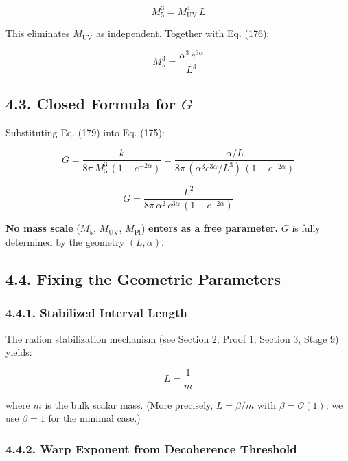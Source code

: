 \documentclass[
  11pt,
]{article}
\begin{document}
\[M_5^3 = M_{\text{UV}}^4\,L \tag{178}\]

This eliminates \(M_{\text{UV}}\) as independent. Together with Eq.
(176):

\[M_5^3 = \frac{\alpha^3\,e^{3\alpha}}{L^3} \tag{179}\]

\bigskip

\hypertarget{closed-formula-for-g}{%
\subsection{\texorpdfstring{4.3. Closed Formula for
\(G\)}{4.3. Closed Formula for G}}\label{closed-formula-for-g}}

Substituting Eq. (179) into Eq. (175):

\[G = \frac{k}{8\pi\,M_5^3\,(1 - e^{-2\alpha})} = \frac{\alpha/L}{8\pi\,(\alpha^3 e^{3\alpha}/L^3)\,(1 - e^{-2\alpha})} \tag{180}\]

\[\boxed{G = \frac{L^2}{8\pi\,\alpha^2\,e^{3\alpha}\,(1 - e^{-2\alpha})}} \tag{181}\]

\textbf{No mass scale} (\(M_5\), \(M_{\text{UV}}\), \(M_{\text{Pl}}\))
\textbf{enters as a free parameter.} \(G\) is fully determined by the
geometry \((L, \alpha)\).

\bigskip

\hypertarget{fixing-the-geometric-parameters}{%
\subsection{4.4. Fixing the Geometric
Parameters}\label{fixing-the-geometric-parameters}}

\hypertarget{stabilized-interval-length}{%
\subsubsection{4.4.1. Stabilized Interval
Length}\label{stabilized-interval-length}}

The radion stabilization mechanism (see Section 2, Proof 1; Section 3,
Stage 9) yields:

\[L = \frac{1}{m} \tag{182}\]

where \(m\) is the bulk scalar mass. (More precisely, \(L = \beta/m\)
with \(\beta = \mathcal{O}(1)\); we use \(\beta = 1\) for the minimal
case.)

\hypertarget{warp-exponent-from-decoherence-threshold}{%
\subsubsection{4.4.2. Warp Exponent from Decoherence
Threshold}\label{warp-exponent-from-decoherence-threshold}}
\end{document}

